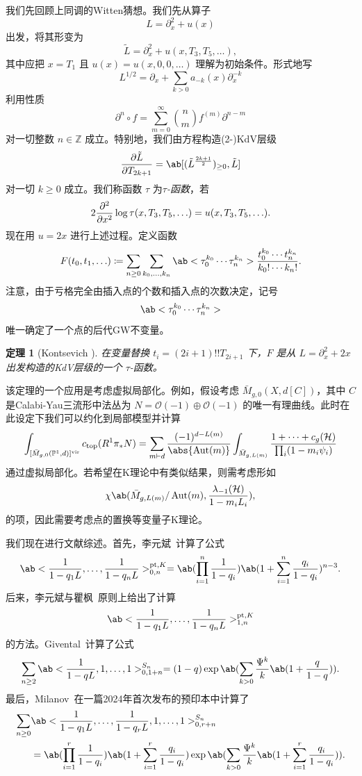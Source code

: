 \documentclass{amsart}
\newtheorem{thm}{定理}[section]
\theoremstyle{definition}
\theoremstyle{remark}
\theoremstyle{plain}
\theoremstyle{definition}
\theoremstyle{remark}
\newcommand{\Z}{\mathbb{Z}}
\renewcommand{\P}{\mathbb{P}}
\newcommand{\mc}[1]{\mathcal{#1}}
\newcommand{\mr}[1]{\mathrm{#1}}
\newcommand{\1}{\mathbf{1}}
\newcommand{\2}{\mathbf{2}}
\newcommand{\3}{\mathbf{3}}
\newcommand{\vir}{\mr{vir}}
\DeclareMathOperator{\Aut}{Aut}
\begin{document}
我们先回顾上同调的Witten猜想。我们先从算子
\[ L = \partial_x^2 + u(x) \]
出发，将其形变为
\[ \tilde{L} = \partial_x^2 + u(x, T_3, T_5, \ldots), \]
其中应把 \(x = T_1\) 且 \(u(x) = u(x, 0, 0,\ldots)\) 理解为初始条件。形式地写
\[ L^{1/2} = \partial_x + \sum_{k > 0} a_{-k}(x) \partial_x^{-k} \]
利用性质
\[ \partial^n \circ f = \sum_{m = 0}^{\infty} \binom{n}{m} f^{(m)} \partial^{n-m} \]
对一切整数 \(n \in \Z\) 成立。特别地，我们由方程构造(2-)KdV层级
\[ \pdv{\tilde{L}}{T_{2k+1}} = \ab[(\tilde{L}^{\frac{2k+1}{2}})_{\geq 0}, \tilde{L}] \]
对一切 \(k \geq 0\) 成立。我们称函数 \(\tau\) 为\textit{\(\tau\)-函数}，若
\[ 2 \pdv[2]{}{x}\log \tau(x, T_3, T_5, \ldots) = u(x, T_3, T_5, \ldots). \]
现在用 \(u = 2x\) 进行上述过程。定义函数
\[ F(t_0, t_1, \ldots) \coloneqq \sum_{n \geq 0} \sum_{k_0, \ldots, k_n} \ab<\tau_0^{k_0} \cdots \tau_n^{k_n}> \frac{t_0^{k_0} \cdots t_n^{k_n}}{k_0! \cdots k_n!}. \]
注意，由于亏格完全由插入点的个数和插入点的次数决定，记号
\[ \ab<\tau_0^{k_0} \cdots \tau_n^{k_n}> \]
唯一确定了一个点的后代GW不变量。

\begin{thm}[Kontsevich {\cite{Kontsevich1992}}]
    在变量替换 \(t_i = (2i+1)!! T_{2i+1}\) 下，\(F\) 是从 \(L = \partial_x^2 + 2x\) 出发构造的KdV层级的一个 \(\tau\)-函数。
\end{thm}

该定理的一个应用是考虑虚拟局部化。例如，假设考虑 \(\bar{M}_{g,0}(X, d[C])\)，其中 \(C\) 是Calabi-Yau三流形中法丛为 \(N = \mc{O}(-1)\oplus \mc{O}(-1)\) 的唯一有理曲线。此时在此设定下我们可以约化到局部模型并计算
\begin{align*}
    \int_{[\bar{M}_{g,0}(\P^1, d)]^{\vir}} c_{\mr{top}}(R^1 \pi_* N) = \sum_{m \vdash d} \frac{(-1)^{d-L(m)}}{\abs{\Aut(m)}} \int_{\bar{M}_{g, L(m)}} \frac{1 + \cdots + c_g(\mc{H})}{\prod_i (1-m_i \psi_i)}
\end{align*}
通过虚拟局部化。若希望在K理论中有类似结果，则需考虑形如
\[ \chi\ab(\bar{M}_{g, L(m)}/\Aut(m), \frac{\lambda_{-1}(\mc{H})}{1-m_i L_i}), \]
的项，因此需要考虑点的置换等变量子K理论。

我们现在进行文献综述。首先，李元斌~\cite{Lee1997}计算了公式
\[ \ab<\frac{1}{1-q_1 L}, \ldots, \frac{1}{1-q_n L}>_{0,n}^{\mr{pt}, K} = \ab(\prod_{i=1}^n \frac{1}{1-q_i}) \ab(1 + \sum_{i=1}^n \frac{q_i}{1-q_i})^{n-3}. \]
后来，李元斌与瞿枫~\cite{LeeQu2014}原则上给出了计算
\[ \ab<\frac{1}{1-q_1 L}, \ldots, \frac{1}{1-q_n L}>_{1,n}^{\mr{pt}, K} \]
的方法。Givental~\cite{Givental2017K1}计算了公式
\[ \sum_{n \geq 2} \ab<\frac{1}{1-q L}, 1, \ldots, 1>_{0,1+n}^{S_n} = (1-q) \exp\ab(\sum_{k > 0} \frac{\Psi^k}{k} \ab(1 + \frac{q}{1-q})). \]
最后，Milanov~\cite{Milanov2025}在一篇2024年首次发布的预印本中计算了
\begin{align*}
    \sum_{n \geq 0}& \ab<\frac{1}{1-q_1 L}, \ldots, \frac{1}{1-q_r L}, 1, \ldots, 1>_{0,r+n}^{S_n} \\
    &= \ab(\prod_{i=1}^{r} \frac{1}{1-q_i})\ab(1 + \sum_{i=1}^r \frac{q_i}{1-q_i}) \exp\ab(\sum_{k > 0} \frac{\Psi^k}{k} \ab(1 + \sum_{i=1}^r \frac{q_i}{1-q_i})).
\end{align*}
\end{document}
